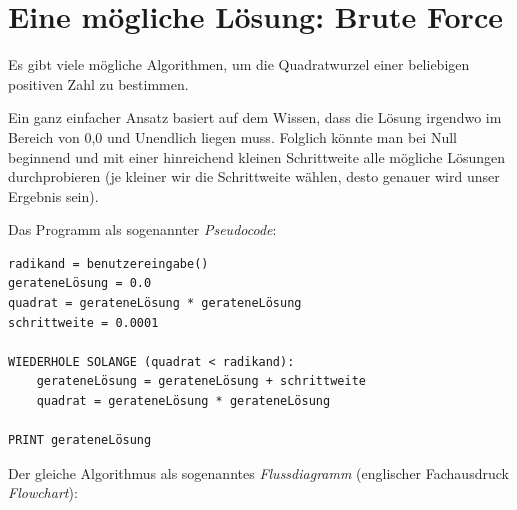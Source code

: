 \clearpage

\rehead[]{\textcolor{lightblue}{AvHG, Inf, My}}
\lohead[]{\textcolor{lightblue}{AvHG, Inf, My}}

\lstset{style=myJava}


\section{Eine mögliche Lösung: Brute Force}

Es gibt viele mögliche Algorithmen, um die Quadratwurzel einer beliebigen
positiven Zahl zu bestimmen.

Ein ganz einfacher Ansatz basiert auf dem Wissen, dass die Lösung irgendwo im
Bereich von 0,0 und Unendlich liegen muss. Folglich könnte man bei Null
beginnend und mit einer hinreichend kleinen Schrittweite alle mögliche Lösungen
durchprobieren (je kleiner wir die Schrittweite wählen, desto genauer wird
unser Ergebnis sein).

Das Programm als sogenannter \emph{Pseudocode}:

\begin{lstlisting}
radikand = benutzereingabe()
gerateneLösung = 0.0
quadrat = gerateneLösung * gerateneLösung
schrittweite = 0.0001

WIEDERHOLE SOLANGE (quadrat < radikand):
    gerateneLösung = gerateneLösung + schrittweite
    quadrat = gerateneLösung * gerateneLösung

PRINT gerateneLösung
\end{lstlisting}

Der gleiche Algorithmus als sogenanntes \emph{Flussdiagramm} (englischer
Fachausdruck \emph{Flowchart}):

